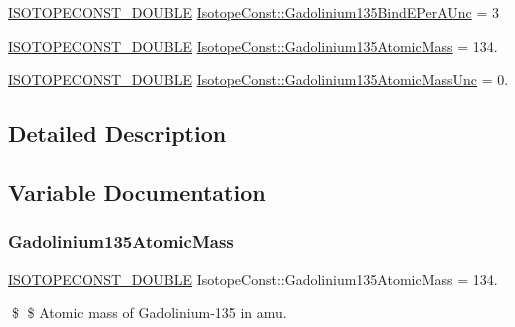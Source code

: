 \begin{DoxyCompactItemize}
\mbox{\hyperlink{group___isotope_const-_macros_ga8f45a7272ce02c0b4c65c44636ed719a}{I\+S\+O\+T\+O\+P\+E\+C\+O\+N\+S\+T\+\_\+\+D\+O\+U\+B\+LE}} \mbox{\hyperlink{group___isotope_const-_gadolinium-_gd135_gae6a7a3d3e7211f60b136234205143689}{Isotope\+Const\+::\+Gadolinium135\+Bind\+E\+Per\+A\+Unc}} = 3
\item 
\mbox{\hyperlink{group___isotope_const-_macros_ga8f45a7272ce02c0b4c65c44636ed719a}{I\+S\+O\+T\+O\+P\+E\+C\+O\+N\+S\+T\+\_\+\+D\+O\+U\+B\+LE}} \mbox{\hyperlink{group___isotope_const-_gadolinium-_gd135_ga9c97cb472a1cddf74ce1f46afa0d9540}{Isotope\+Const\+::\+Gadolinium135\+Atomic\+Mass}} = 134.
\item 
\mbox{\hyperlink{group___isotope_const-_macros_ga8f45a7272ce02c0b4c65c44636ed719a}{I\+S\+O\+T\+O\+P\+E\+C\+O\+N\+S\+T\+\_\+\+D\+O\+U\+B\+LE}} \mbox{\hyperlink{group___isotope_const-_gadolinium-_gd135_gaa7aff8a78a62134d56b640b215bc040c}{Isotope\+Const\+::\+Gadolinium135\+Atomic\+Mass\+Unc}} = 0.
\end{DoxyCompactItemize}


\subsection{Detailed Description}


\subsection{Variable Documentation}
\mbox{\label{group___isotope_const-_gadolinium-_gd135_ga9c97cb472a1cddf74ce1f46afa0d9540}} 
\subsubsection{\texorpdfstring{Gadolinium135\+Atomic\+Mass}{Gadolinium135AtomicMass}}
{\footnotesize\ttfamily \mbox{\hyperlink{group___isotope_const-_macros_ga8f45a7272ce02c0b4c65c44636ed719a}{I\+S\+O\+T\+O\+P\+E\+C\+O\+N\+S\+T\+\_\+\+D\+O\+U\+B\+LE}} Isotope\+Const\+::\+Gadolinium135\+Atomic\+Mass = 134.}

\$ \$ Atomic mass of Gadolinium-\/135 in amu. \mbox{\label{group___isotope_const-_gadolinium-_gd135_gaa7aff8a78a62134d56b640b215bc040c}} 

